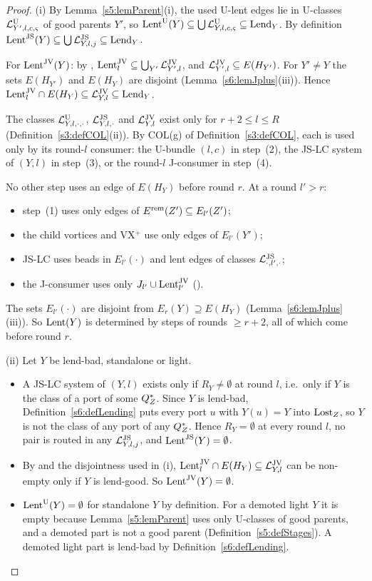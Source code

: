 \begin{proof}
(i) By Lemma~\ref{s5:lemParent}(i), the used U-lent edges lie in U-classes $\mathcal{L}^{\mathrm{U}}_{Y',l,c,\varsigma}$ of good parents $Y'$, so $\mathrm{Lent}^{\mathrm{U}}(Y)\subseteq\bigcup\mathcal{L}^{\mathrm{U}}_{Y,l,c,\varsigma}\subseteq\mathrm{Lend}_Y$. By definition $\mathrm{Lent}^{\mathrm{JS}}(Y)\subseteq\bigcup\mathcal{L}^{\mathrm{JS}}_{Y,l,j}\subseteq\mathrm{Lend}_Y$.

For $\mathrm{Lent}^{\mathrm{JV}}(Y)$: by , $\mathrm{Lent}^{\mathrm{JV}}_l\subseteq\bigcup_{Y'}\mathcal{L}^{\mathrm{JV}}_{Y',l}$, and $\mathcal{L}^{\mathrm{JV}}_{Y',l}\subseteq E(H_{Y'})$. For $Y'\neq Y$ the sets $E(H_{Y'})$ and $E(H_Y)$ are disjoint (Lemma~\ref{s6:lemJplus}(iii)). Hence $\mathrm{Lent}^{\mathrm{JV}}_l\cap E(H_Y)\subseteq\mathcal{L}^{\mathrm{JV}}_{Y,l}\subseteq\mathrm{Lend}_Y$.

The classes $\mathcal{L}^{\mathrm{U}}_{Y,l,\cdot,\cdot}$, $\mathcal{L}^{\mathrm{JS}}_{Y,l,\cdot}$ and $\mathcal{L}^{\mathrm{JV}}_{Y,l}$ exist only for $r+2\le l\le R$ (Definition~\ref{s3:defCOL}(ii)). By COL(g) of Definition~\ref{s3:defCOL}, each is used only by its round-$l$ consumer: the U-bundle $(l,c)$ in step~(2), the JS-LC system of $(Y,l)$ in step~(3), or the round-$l$ J-consumer in step~(4).

No other step uses an edge of $E(H_Y)$ before round $r$. At a round $l'>r$:
\begin{itemize}
\item step~(1) uses only edges of $E^{\mathrm{rem}}(Z')\subseteq E_{l'}(Z')$;
\item the child vortices and VX$^+$ use only edges of $E_{l'}(Y')$;
\item JS-LC uses beads in $E_{l'}(\cdot)$ and lent edges of classes $\mathcal{L}^{\mathrm{JS}}_{\cdot,l',\cdot}$;
\item the J-consumer uses only $J_{l'}\cup\mathrm{Lent}^{\mathrm{JV}}_{l'}$ ().
\end{itemize}
The sets $E_{l'}(\cdot)$ are disjoint from $E_r(Y)\supseteq E(H_Y)$ (Lemma~\ref{s6:lemJplus}(iii)). So $\mathrm{Lent}(Y)$ is determined by steps of rounds $\ge r+2$, all of which come before round $r$.

(ii) Let $Y$ be lend-bad, standalone or light.
\begin{itemize}
\item A JS-LC system of $(Y,l)$ exists only if $R_Y\neq\emptyset$ at round $l$, i.e.\ only if $Y$ is the class of a port of some $Q^{*}_Z$. Since $Y$ is lend-bad, Definition~\ref{s6:defLending} puts every port $u$ with $Y(u)=Y$ into $\mathrm{Lost}_Z$, so $Y$ is not the class of any port of any $Q^{*}_Z$. Hence $R_Y=\emptyset$ at every round $l$, no pair is routed in any $\mathcal{L}^{\mathrm{JS}}_{Y,l,j}$, and $\mathrm{Lent}^{\mathrm{JS}}(Y)=\emptyset$.
\item By  and the disjointness used in (i), $\mathrm{Lent}^{\mathrm{JV}}_l\cap E(H_Y)\subseteq\mathcal{L}^{\mathrm{JV}}_{Y,l}$ can be non-empty only if $Y$ is lend-good. So $\mathrm{Lent}^{\mathrm{JV}}(Y)=\emptyset$.
\item $\mathrm{Lent}^{\mathrm{U}}(Y)=\emptyset$ for standalone $Y$ by definition. For a demoted light $Y$ it is empty because Lemma~\ref{s5:lemParent} uses only U-classes of good parents, and a demoted part is not a good parent (Definition~\ref{s5:defStages}). A demoted light part is lend-bad by Definition~\ref{s6:defLending}.
\end{itemize}


\end{proof}
